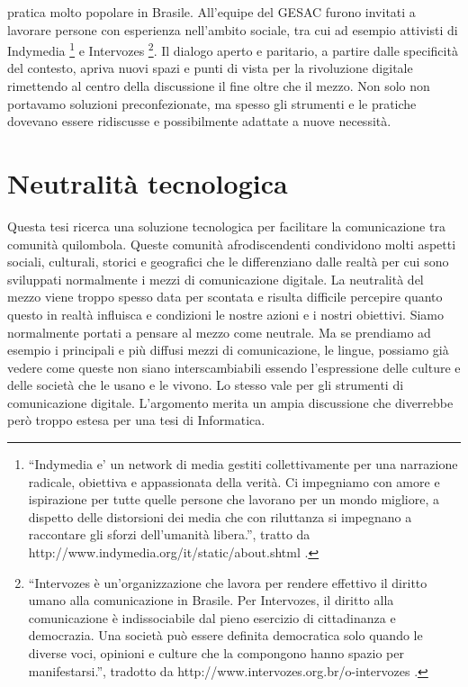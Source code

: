 pratica molto popolare in Brasile. All'equipe del GESAC furono
invitati a lavorare persone con esperienza nell'ambito sociale, tra
cui ad esempio attivisti di Indymedia \footnote{``Indymedia e' un
  network di media gestiti collettivamente per una narrazione
  radicale, obiettiva e appassionata della verità. Ci impegniamo con
  amore e ispirazione per tutte quelle persone che lavorano per un
  mondo migliore, a dispetto delle distorsioni dei media che con
  riluttanza si impegnano a raccontare gli sforzi dell'umanità
  libera.'', tratto da http://www.indymedia.org/it/static/about.shtml
  .} e Intervozes \footnote{``Intervozes è un'organizzazione che
  lavora per rendere effettivo il diritto umano alla comunicazione in
  Brasile.  Per Intervozes, il diritto alla comunicazione è
  indissociabile dal pieno esercizio di cittadinanza e democrazia. Una
  società può essere definita democratica solo quando le diverse voci,
  opinioni e culture che la compongono hanno spazio per
  manifestarsi.'', tradotto da
  http://www.intervozes.org.br/o-intervozes .}. Il dialogo aperto e
paritario, a partire dalle specificità del contesto, apriva nuovi
spazi e punti di vista per la rivoluzione digitale rimettendo al
centro della discussione il fine oltre che il mezzo. Non solo non
portavamo soluzioni preconfezionate, ma spesso gli strumenti e le
pratiche dovevano essere ridiscusse e possibilmente adattate a nuove
necessità.

\section{Neutralità tecnologica}
Questa tesi ricerca una soluzione tecnologica per facilitare la
comunicazione tra comunità quilombola. Queste comunità afrodiscendenti
condividono molti aspetti sociali, culturali, storici e geografici che
le differenziano dalle realtà per cui sono sviluppati normalmente i
mezzi di comunicazione digitale.  La neutralità del mezzo viene troppo
spesso data per scontata e risulta difficile percepire quanto questo
in realtà influisca e condizioni le nostre azioni e i nostri
obiettivi. Siamo normalmente portati a pensare al mezzo come
neutrale. Ma se prendiamo ad esempio i principali e più diffusi mezzi
di comunicazione, le lingue, possiamo già vedere come queste non siano
interscambiabili essendo l'espressione delle culture e delle società
che le usano e le vivono. Lo stesso vale per gli strumenti di
comunicazione digitale. L'argomento merita un ampia discussione che
diverrebbe però troppo estesa per una tesi di Informatica.


